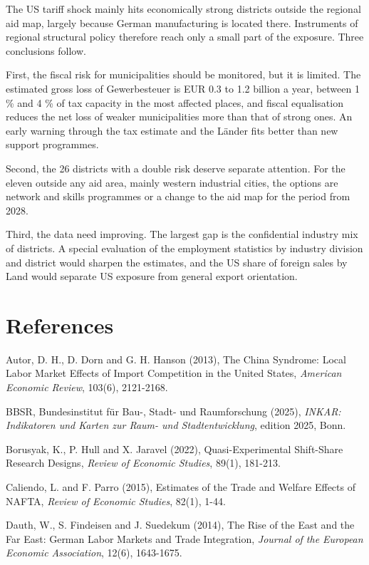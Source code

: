 \documentclass[
  11pt,
]{article}
\begin{document}
The US tariff shock mainly hits economically strong districts outside
the regional aid map, largely because German manufacturing is located
there. Instruments of regional structural policy therefore reach only a
small part of the exposure. Three conclusions follow.

First, the fiscal risk for municipalities should be monitored, but it is
limited. The estimated gross loss of Gewerbesteuer is EUR 0.3 to 1.2
billion a year, between 1 \% and 4 \% of tax capacity in the most
affected places, and fiscal equalisation reduces the net loss of weaker
municipalities more than that of strong ones. An early warning through
the tax estimate and the Länder fits better than new support programmes.

Second, the 26 districts with a double risk deserve separate attention.
For the eleven outside any aid area, mainly western industrial cities,
the options are network and skills programmes or a change to the aid map
for the period from 2028.

Third, the data need improving. The largest gap is the confidential
industry mix of districts. A special evaluation of the employment
statistics by industry division and district would sharpen the
estimates, and the US share of foreign sales by Land would separate US
exposure from general export orientation.

\hypertarget{references}{%
\section{References}\label{references}}

Autor, D. H., D. Dorn and G. H. Hanson (2013), The China Syndrome: Local
Labor Market Effects of Import Competition in the United States,
\emph{American Economic Review}, 103(6), 2121-2168.

BBSR, Bundesinstitut für Bau-, Stadt- und Raumforschung (2025),
\emph{INKAR: Indikatoren und Karten zur Raum- und Stadtentwicklung},
edition 2025, Bonn.

Borusyak, K., P. Hull and X. Jaravel (2022), Quasi-Experimental
Shift-Share Research Designs, \emph{Review of Economic Studies}, 89(1),
181-213.

Caliendo, L. and F. Parro (2015), Estimates of the Trade and Welfare
Effects of NAFTA, \emph{Review of Economic Studies}, 82(1), 1-44.

Dauth, W., S. Findeisen and J. Suedekum (2014), The Rise of the East and
the Far East: German Labor Markets and Trade Integration, \emph{Journal
of the European Economic Association}, 12(6), 1643-1675.
\end{document}
